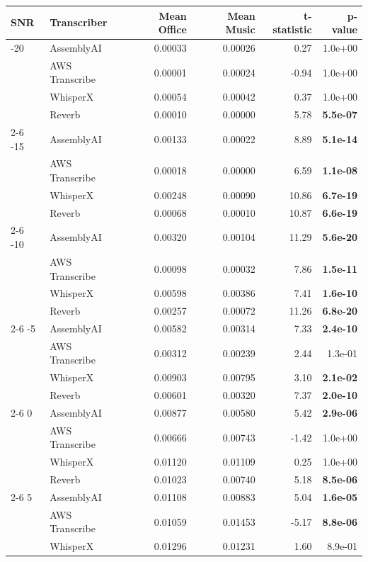 \begin{tabular}{llrrrr}
\toprule
SNR & Transcriber & Mean Office & Mean Music & t-statistic & p-value \\
\midrule
-20 & AssemblyAI & 0.00033 & 0.00026 & 0.27 &  1.0e+00 \\
  & AWS Transcribe & 0.00001 & 0.00024 & -0.94 &  1.0e+00 \\
  & WhisperX & 0.00054 & 0.00042 & 0.37 &  1.0e+00 \\
  & Reverb & 0.00010 & 0.00000 & 5.78 & \textbf{ 5.5e-07} \\
\cmidrule(r){2-6}
-15 & AssemblyAI & 0.00133 & 0.00022 & 8.89 & \textbf{ 5.1e-14} \\
  & AWS Transcribe & 0.00018 & 0.00000 & 6.59 & \textbf{ 1.1e-08} \\
  & WhisperX & 0.00248 & 0.00090 & 10.86 & \textbf{ 6.7e-19} \\
  & Reverb & 0.00068 & 0.00010 & 10.87 & \textbf{ 6.6e-19} \\
\cmidrule(r){2-6}
-10 & AssemblyAI & 0.00320 & 0.00104 & 11.29 & \textbf{ 5.6e-20} \\
  & AWS Transcribe & 0.00098 & 0.00032 & 7.86 & \textbf{ 1.5e-11} \\
  & WhisperX & 0.00598 & 0.00386 & 7.41 & \textbf{ 1.6e-10} \\
  & Reverb & 0.00257 & 0.00072 & 11.26 & \textbf{ 6.8e-20} \\
\cmidrule(r){2-6}
-5 & AssemblyAI & 0.00582 & 0.00314 & 7.33 & \textbf{ 2.4e-10} \\
  & AWS Transcribe & 0.00312 & 0.00239 & 2.44 &  1.3e-01 \\
  & WhisperX & 0.00903 & 0.00795 & 3.10 & \textbf{ 2.1e-02} \\
  & Reverb & 0.00601 & 0.00320 & 7.37 & \textbf{ 2.0e-10} \\
\cmidrule(r){2-6}
0 & AssemblyAI & 0.00877 & 0.00580 & 5.42 & \textbf{ 2.9e-06} \\
  & AWS Transcribe & 0.00666 & 0.00743 & -1.42 &  1.0e+00 \\
  & WhisperX & 0.01120 & 0.01109 & 0.25 &  1.0e+00 \\
  & Reverb & 0.01023 & 0.00740 & 5.18 & \textbf{ 8.5e-06} \\
\cmidrule(r){2-6}
5 & AssemblyAI & 0.01108 & 0.00883 & 5.04 & \textbf{ 1.6e-05} \\
  & AWS Transcribe & 0.01059 & 0.01453 & -5.17 & \textbf{ 8.8e-06} \\
  & WhisperX & 0.01296 & 0.01231 & 1.60 &  8.9e-01 \\

\end{tabular}
